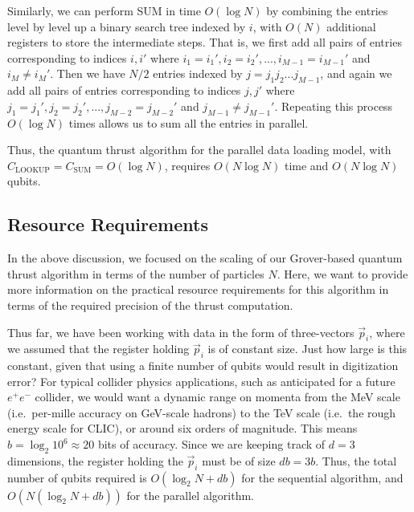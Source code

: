 \documentclass[aps,prd,twocolumn,superscriptaddress,preprintnumbers,nofootinbib,longbibliography,floatfix]{revtex4-1}
\begin{document}
Similarly, we can perform SUM in time $O(\log N)$ by combining the entries level by level up a binary search tree indexed by $i$, with $O(N)$ additional registers to store the intermediate steps.
%
That is, we first add all pairs of entries corresponding to indices $i, i'$ where $i_1=i_1', i_2=i_2',...,i_{M-1}=i_{M-1}'$ and $i_M\neq i_M'$.
%
Then we have $N/2$ entries indexed by $j=j_1j_2...j_{M-1}$, and again we add all pairs of entries corresponding to indices $j, j'$ where $j_1=j_1', j_2=j_2',...,j_{M-2}=j_{M-2}'$ and $j_{M-1}\neq j_{M-1}'$.
%
Repeating this process $O(\log N)$ times allows us to sum all the entries in parallel.


Thus, the quantum thrust algorithm for the parallel data loading model, with $C_{\text{LOOKUP}} = C_{\text{SUM}} = O(\log N)$, requires $O(N \log N)$ time and $O(N\log N)$ qubits.


%
%

\subsection{Resource Requirements}
\label{sec:resource}

In the above discussion, we focused on the scaling of our Grover-based quantum thrust algorithm in terms of the number of particles $N$.
%
Here, we want to provide more information on the practical resource requirements for this algorithm in terms of the required precision of the thrust computation.


Thus far, we have been working with data in the form of three-vectors $\vec{p}_i$, where we assumed that the register holding $\vec{p}_i$ is of constant size.
%
Just how large is this constant, given that using a finite number of qubits would result in digitization error?
%
For typical collider physics applications, such as anticipated for a future $e^+e^-$ collider, we would want a dynamic range on momenta from the MeV scale (i.e.~per-mille accuracy on GeV-scale hadrons) to the TeV scale (i.e.~the rough energy scale for CLIC), or around six orders of magnitude.
%
This means $b=\log_2 10^6 \approx 20$ bits of accuracy.
%
Since we are keeping track of $d=3$ dimensions, the register holding the $\vec{p}_i$ must be of size $db=3b$.
%
Thus, the total number of qubits required is $O(\log_2 N + db)$ for the sequential algorithm, and $O(N(\log_2 N + db))$ for the parallel algorithm.
\end{document}
